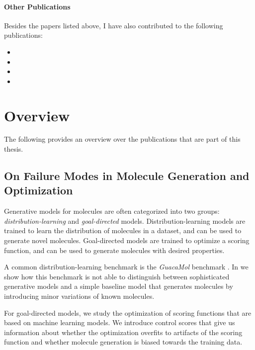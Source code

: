 \paragraph{Other Publications} Besides the papers listed above, I have also
contributed to the following publications:

\begin{itemize}
    \item {}
    \item {}
    \item {}
    \item {}
\end{itemize}

\section{Overview}
The following provides an overview over the publications that are part of this
thesis.

\subsection{On Failure Modes in Molecule Generation and Optimization}
Generative models for molecules are often categorized into two groups:
\emph{distribution-learning} and \emph{goal-directed} models.
Distribution-learning models are trained to learn the distribution of
molecules in a dataset, and can be used to generate novel molecules.
Goal-directed models are trained to optimize a scoring function, and can be
used to generate molecules with desired properties.

A common distribution-learning benchmark is the \emph{GuacaMol} benchmark
\citep{brownGuacaMolBenchmarkingModels2019}. In \citep{renzFailureModesMolecule2019}
we show how this benchmark is not able to distinguish between sophisticated
generative models and a simple baseline model that generates molecules
by introducing minor variations of known molecules.

For goal-directed models, we study the optimization of scoring functions that are
based on machine learning models. We introduce control scores that give us information
about whether the optimization overfits to artifacts of the scoring function and
whether molecule generation is biased towards the training data.

